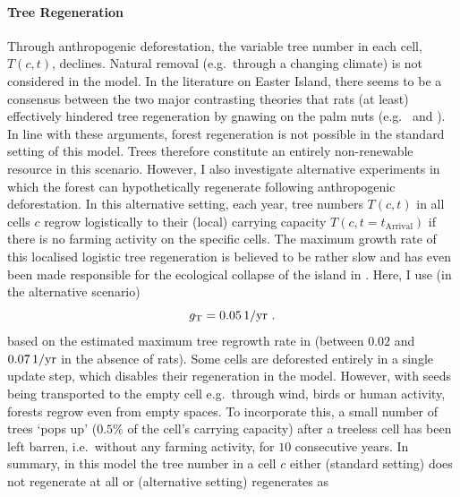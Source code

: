 \paragraph{Tree Regeneration}
Through anthropogenic deforestation, the variable tree number in each cell, $T(c,t)$, declines.
Natural removal (e.g.\ through a changing climate) is not considered in the model.
In the literature on Easter Island, there seems to be a consensus between the two major contrasting theories that rats (at least) effectively hindered tree regeneration by gnawing on the palm nuts (e.g.\ \citet{Bahn2017} and \citet{Hunt2007}).
In line with these arguments, forest regeneration is not possible in the standard setting of this model.
Trees therefore constitute an entirely non-renewable resource in this scenario. 
However, I also investigate alternative experiments in which the forest can hypothetically regenerate following anthropogenic deforestation.
In this alternative setting, each year, tree numbers $T(c,t)$ in all cells $c$ regrow logistically to their (local) carrying capacity $T(c,t=t_\text{Arrival})$ if there is no farming activity on the specific cells.
The maximum growth rate of this localised logistic tree regeneration is believed to be rather slow and has even been made responsible for the ecological collapse of the island in \citet{Brander1998}.
Here, I use (in the alternative scenario)
\begin{equation}
g_{\rm T} = 0.05\, \rm{1/yr} \ .
\end{equation}
based on the estimated maximum tree regrowth rate in \citet{Brandt2015} (between $0.02$ and $0.07 \, \rm{1/yr}$ in the absence of rats).
Some cells are deforested entirely in a single update step, which disables their regeneration in the model. 
However, with seeds being transported to the empty cell e.g.\ through wind, birds or human activity, forests regrow even from empty spaces.
To incorporate this, a small number of trees `pops up' ($0.5\%$ of the cell's carrying capacity) after a treeless cell has been left barren, i.e.\ without any farming activity, for $10$ consecutive years.
In summary, in this model the tree number in a cell $c$ either (standard setting) does not regenerate at all or (alternative setting) regenerates as
